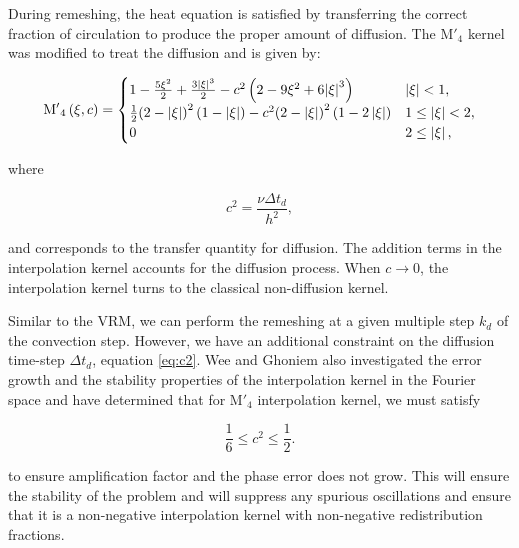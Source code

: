 During remeshing, the heat equation is satisfied by transferring the correct fraction of circulation to produce the proper amount of diffusion. The $\mathrm{M'}_4$ kernel was modified to treat the diffusion and is given by: 

\begin{equation}
{{{\rm{M'}}}_4}\left( {\xi ,c} \right) =
  \begin{cases}
   {1 - \frac{{5{\xi ^2}}}{2} + \frac{{3{{\left| \xi  \right|}^3}}}{2} - {c^2}\left( {2 - 9{\xi ^2} + 6{{\left| \xi  \right|}^3}} \right)} & {\left| \xi \right|} < 1, \\
   \frac{1}{2}{\left( {2 - \left| \xi  \right|} \right)^2}\left( {1 - \left| \xi  \right|} \right) - {c^2}{\left( {2 - \left| \xi  \right|} \right)^2}\left( {1 - 2\left| \xi  \right|} \right) & 1 \le {\left| \xi \right|} < 2,\\
   0 & 2 \le \left| \xi \right|,
  \end{cases}
\label{eq:modInterpKernel}
\end{equation}

where 

\begin{equation}
c^2 = \frac{\nu \Delta t_d}{h^2},
\label{eq:c2}
\end{equation}

and corresponds to the transfer quantity for diffusion. The addition terms in the interpolation kernel accounts for the diffusion process. When $c \rightarrow 0$, the interpolation kernel turns to the classical non-diffusion kernel. 

Similar to the VRM, we can perform the remeshing at a given multiple step $k_d$ of the convection step. However, we have an additional constraint on the diffusion time-step $\Delta t_d$, equation \ref{eq:c2}. Wee and Ghoniem \cite{Wee2006} also investigated the error growth and the stability properties of the interpolation kernel in the Fourier space and have determined that for $\mathrm{M'}_4$ interpolation kernel, we must satisfy

\begin{equation}
\frac{1}{6} \le c^2 \le \frac{1}{2}.
\label{eq:c2stability}
\end{equation}

to ensure amplification factor and the phase error does not grow. This will ensure the stability of the problem and will suppress any spurious oscillations and ensure that it is a non-negative interpolation kernel with non-negative redistribution fractions. 

